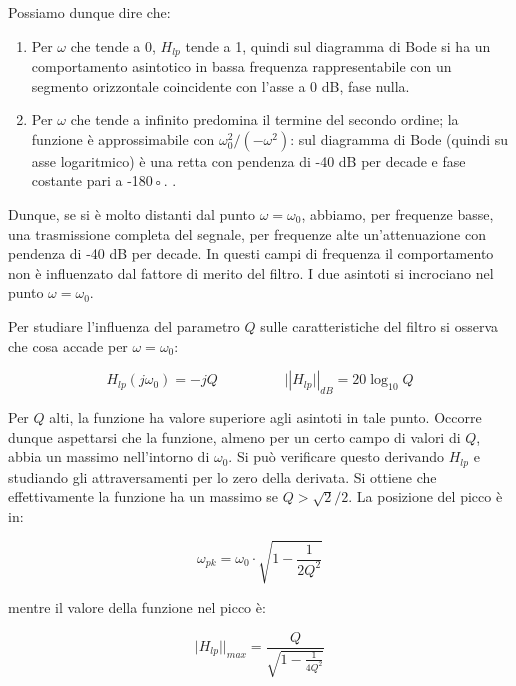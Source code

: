 \documentclass[../main.tex]{subfiles}
\begin{document}
Possiamo dunque dire che:

\begin{enumerate}
	\item[\textbf{-}] Per $\omega$ che tende a 0, $H_{lp}$ tende a 1, quindi sul diagramma di Bode si ha un comportamento asintotico in bassa frequenza rappresentabile con un segmento orizzontale coincidente con l’asse a 0 dB, fase nulla.
	
	\item[\textbf{-}] Per $\omega$ che tende a infinito predomina il termine del secondo ordine; la funzione è approssimabile con $\omega_0^2 / (-\omega^2)$: sul diagramma di Bode (quindi su asse logaritmico) è una retta con pendenza di -40 dB per decade e fase costante pari a -180◦.
.
\end{enumerate}

Dunque, se si è molto distanti dal punto $\omega= \omega_0$, abbiamo, per frequenze basse, una trasmissione completa del segnale, per frequenze alte un’attenuazione con pendenza di -40 dB per decade. In questi campi di frequenza il comportamento non è influenzato dal fattore di merito del filtro. I due asintoti si incrociano nel punto $\omega= \omega_0$.

Per studiare l’influenza del parametro $Q$ sulle caratteristiche del filtro si osserva che cosa accade per $\omega= \omega_0$:

\begin{equation}
	H_{lp}(j\omega_0) = -jQ \hspace{2cm} \big||H_{lp}\big||_{dB} = 20\log_{10} Q  
\end{equation}

Per $Q$ alti, la funzione ha valore superiore agli asintoti in tale punto. Occorre dunque aspettarsi che la funzione, almeno per un certo campo di valori di $Q$, abbia un massimo nell’intorno di $\omega_0$. Si può verificare questo derivando $H_{lp}$ e studiando gli attraversamenti per lo zero della derivata. Si ottiene che effettivamente la funzione ha un massimo se $Q > \sqrt{2} / 2$. La posizione del picco è in:

\begin{equation}
	\omega_{pk} = \omega_0 \cdot \sqrt{1 - \frac{1}{2Q^2}}
\end{equation}

mentre il valore della funzione nel picco è:

\begin{equation}
	\big|H_{lp}\big||_{max} = \frac{Q}{\sqrt{1 - \frac{1}{4Q^2}}}
\end{equation}
\end{document}
